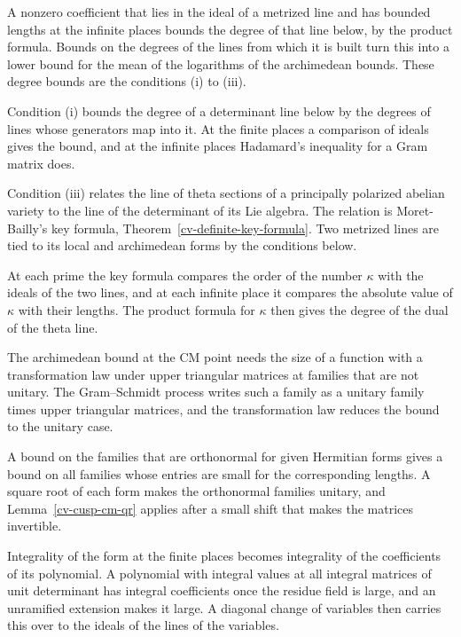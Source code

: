 A nonzero coefficient that lies in the ideal of a metrized line and has bounded lengths at the infinite places
bounds the degree of that line below, by the product formula. Bounds on the degrees of the lines from which
it is built turn this into a lower bound for the mean of the logarithms of the archimedean bounds. These
degree bounds are the conditions (i) to (iii).

Condition (i) bounds the degree of a determinant line below by the degrees of lines whose generators map into
it. At the finite places a comparison of ideals gives the bound, and at the infinite places Hadamard's
inequality for a Gram matrix does.

Condition (iii) relates the line of theta sections of a principally polarized abelian variety to the line of
the determinant of its Lie algebra. The relation is Moret-Bailly's key formula,
Theorem~\ref{cv-definite-key-formula}. Two metrized lines are tied to its local and archimedean forms by the
conditions below.

At each prime the key formula compares the order of the number $\kappa$ with the ideals of the two lines, and at
each infinite place it compares the absolute value of $\kappa$ with their lengths. The product formula for
$\kappa$ then gives the degree of the dual of the theta line.

The archimedean bound at the CM point needs the size of a function with a transformation law under upper
triangular matrices at families that are not unitary. The Gram--Schmidt process writes such a family as a
unitary family times upper triangular matrices, and the transformation law reduces the bound to the unitary
case.

A bound on the families that are orthonormal for given Hermitian forms gives a bound on all families whose
entries are small for the corresponding lengths. A square root of each form makes the orthonormal families
unitary, and Lemma~\ref{cv-cusp-cm-qr} applies after a small shift that makes the matrices invertible.

Integrality of the form at the finite places becomes integrality of the coefficients of its polynomial. A
polynomial with integral values at all integral matrices of unit determinant has integral coefficients once the
residue field is large, and an unramified extension makes it large. A diagonal change of variables then carries
this over to the ideals of the lines of the variables.

